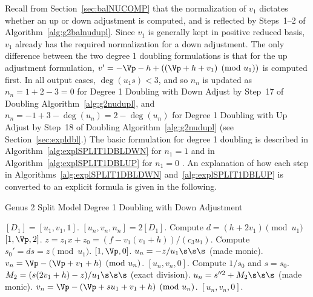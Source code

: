 Recall from Section~\ref{sec:balNUCOMP} that the normalization of $v_1$ dictates
whether an up or down adjustment is computed, and is reflected by Steps~1--2 of
Algorithm~\ref{alg:g2balnudupl}. Since $v_1$ is generally kept in positive
reduced basis, $v_1$ already has the required normalization for a down
adjustment. The only difference between the two degree 1 doubling formulations
is that for the up adjustment formulation, $v' = -\Vp - h + ((\Vp + h + v_1)
\pmod{u_1})$ is computed first. In all output cases, $\deg(u_1s) < 3$, and so
$n_n$ is updated as $n_n = 1 + 2 - 3 = 0$ for Degree 1 Doubling with Down Adjust
by Step~17 of Doubling Algorithm~\ref{alg:g2nudupl}, and $n_n = -1 + 3 -
\deg(u_n) = 2 - \deg(u_n)$ for Degree 1 Doubling with Up Adjust by Step~18 of
Doubling Algorithm~\ref{alg:g2nudupl} (see Section~\ref{sec:expldbl}.) The basic
formulation for degree 1 doubling is described in
Algorithm~\ref{alg:explSPLIT1DBLDWN} for $n_1 = 1$ and in
Algorithm~\ref{alg:explSPLIT1DBLUP} for $n_1 = 0$ . An explanation of how each
step in Algorithms~\ref{alg:explSPLIT1DBLDWN} and~\ref{alg:explSPLIT1DBLUP} is
converted to an explicit formula is given in the following.

\begin{algorithm}[htbp]
\caption{Genus 2 Split Model Degree 1 Doubling with Down Adjustment\label{alg:explSPLIT1DBLDWN}}
\begin{algorithmic} [1]
\Require $[D_1] = [u_1, v_1,1]$.  \smallskip
\Ensure $[u_n,v_n,n_n] = 2[D_1]$.
\algrule
\State Compute $d = (h + 2v_1) \pmod{u_1}$
 \Return $[1,\Vp,2]$.
\EndIf
\State $z = z_1x + z_0 = (f- v_1(v_1 + h))/(c_3u_1).$
\State Compute $s_0' = ds =  z \pmod{u_1}$.
     \Return $[1,\Vp,0]$.
    \EndIf
    \State $u_n = -z/u_1 \s\s\s$ (made monic).
    \State $v_n = \Vp - (\Vp + v_1 + h) \pmod{u_n}$.
    \State \Return $[u_n,v_n,0]$.
\EndIf
\State Compute $1/s_0$ and $s = s_0$.
\State $M_2 = (s(2v_1 + h) - z)/u_1 \s\s\s$ (exact division).
\State $u_n = s^{\prime \prime 2} + M_2 \s\s\s$ (made monic).
\State $v_n = \Vp - (\Vp + su_1 + v_1 + h) \pmod{u_n}$.
\State \Return $[u_n,v_n,0]$.
\end{algorithmic}
\end{algorithm}


